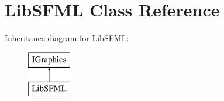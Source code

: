 \hypertarget{class_lib_s_f_m_l}{}\section{Lib\+S\+F\+ML Class Reference}
\label{class_lib_s_f_m_l}
Inheritance diagram for Lib\+S\+F\+ML\+:\begin{figure}[H]
\begin{center}
\leavevmode
\includegraphics[height=2.000000cm]{class_lib_s_f_m_l}
\end{center}
\end{figure}
